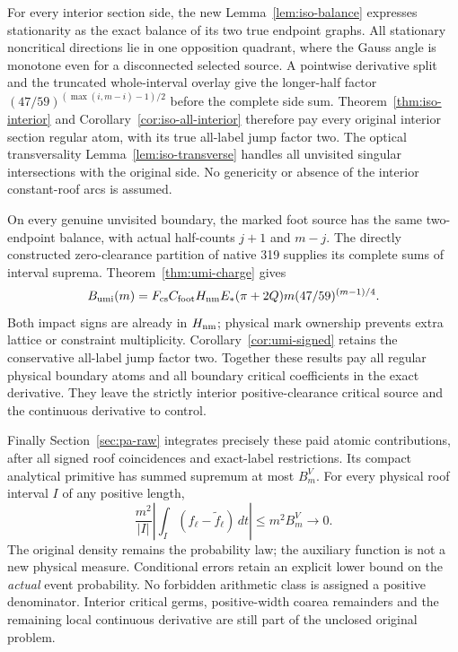 For every interior section side, the new
Lemma~\ref{lem:iso-balance} expresses stationarity as the exact
balance of its two true endpoint graphs. All stationary
noncritical directions lie in one opposition quadrant, where
the Gauss angle is monotone even for a disconnected selected
source. A pointwise derivative split and the truncated
whole-interval overlay give the longer-half factor
$(47/59)^{(\max(i,m-i)-1)/2}$ before the complete side sum.
Theorem~\ref{thm:iso-interior} and
Corollary~\ref{cor:iso-all-interior} therefore pay every
original interior section regular atom, with its true
all-label jump factor two. The optical transversality
Lemma~\ref{lem:iso-transverse} handles all unvisited singular
intersections with the original side. No genericity or
absence of the interior constant-roof arcs is assumed.

On every genuine unvisited boundary, the marked foot source
has the same two-endpoint balance, with actual half-counts
$j+1$ and $m-j$. The directly constructed zero-clearance
partition of native 319 supplies its complete sums of
interval suprema. Theorem~\ref{thm:umi-charge} gives
\[
 B_{\rm umi}(m)=F_{\rm cs}C_{\rm foot}H_{\rm nm}E_*
                       (\pi+2Q)m(47/59)^{(m-1)/4}.
\]
Both impact signs are already in $H_{\rm nm}$; physical
mark ownership prevents extra lattice or constraint
multiplicity. Corollary~\ref{cor:umi-signed} retains the
conservative all-label jump factor two. Together these
results pay all regular physical boundary atoms and all
boundary critical coefficients in the exact derivative.
They leave the strictly interior positive-clearance
critical source and the continuous derivative to control.

Finally Section~\ref{sec:pa-raw} integrates precisely these
paid atomic contributions, after all signed roof coincidences
and exact-label restrictions. Its compact analytical primitive
has summed supremum at most $B_m^V$. For every physical roof
interval $I$ of any positive length,
\[
 \frac{m^2}{|I|}\left|\int_I(f_\ell-\widetilde f_\ell)\,dt\right|
                           \le m^2B_m^V\longrightarrow0.
\]
The original density remains the probability law; the auxiliary
function is not a new physical measure. Conditional errors
retain an explicit lower bound on the \emph{actual} event
probability. No forbidden arithmetic class is assigned a
positive denominator. Interior critical germs, positive-width
coarea remainders and the remaining local continuous derivative
are still part of the unclosed original problem.
